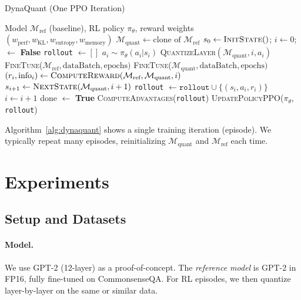 \documentclass{article}
\begin{document}
	\begin{algorithm}[h]
		\footnotesize
		\caption{DynaQuant (One PPO Iteration)}
		\label{alg:dynaquant}
		\begin{algorithmic}[1]
			\REQUIRE Model $\mathcal{M}_\text{ref}$ (baseline), RL policy $\pi_\theta$, reward weights $(w_{\mathrm{perf}}, w_{\mathrm{KL}}, w_{\mathrm{entropy}}, w_{\mathrm{memory}})$
			\STATE $\mathcal{M}_\text{quant} \leftarrow \text{clone of } \mathcal{M}_\text{ref}$
			\STATE $s_0 \leftarrow \textsc{InitState}()$; $i \leftarrow 0$;  $\leftarrow$ \textbf{False}
			\STATE \texttt{rollout} $\leftarrow []$
			\STATE $a_i \sim \pi_\theta(a_i|s_i)$
			\STATE \textsc{QuantizeLayer}$(\mathcal{M}_\text{quant}, i, a_i)$
			\STATE \textsc{FineTune}($\mathcal{M}_\text{ref}, \text{dataBatch}, \text{epochs})$
			\STATE \textsc{FineTune}($\mathcal{M}_\text{quant}, \text{dataBatch}, \text{epochs})$
			\STATE $(r_i, \text{info}_i) \leftarrow \textsc{ComputeReward}(\mathcal{M}_\text{ref}, \mathcal{M}_\text{quant}, i)$
			\STATE $s_{i+1} \leftarrow \textsc{NextState}(\mathcal{M}_\text{quant}, i+1)$
			\STATE \texttt{rollout} $\leftarrow \texttt{rollout}\cup \{(s_i,a_i,r_i)\}$
			\STATE $i \leftarrow i+1$
			\STATE done $\leftarrow$ \textbf{True}
			\ENDIF
			\ENDWHILE
			\STATE \textsc{ComputeAdvantages}(\texttt{rollout})
			\STATE \textsc{UpdatePolicyPPO}($\pi_\theta$, \texttt{rollout})
		\end{algorithmic}
	\end{algorithm}
	
	Algorithm~\ref{alg:dynaquant} shows a single training iteration (episode). We typically repeat many episodes, reinitializing $\mathcal{M}_\text{quant}$ and $\mathcal{M}_\text{ref}$ each time.
	
	
	\section{Experiments}
	\label{sec:experiments}
	
	\subsection{Setup and Datasets}
	\paragraph{Model.}
	We use GPT-2 (12-layer) as a proof-of-concept. The \emph{reference model} is GPT-2 in FP16, fully fine-tuned on CommonsenseQA. For RL episodes, we then quantize layer-by-layer on the same or similar data.
	
\end{document}
